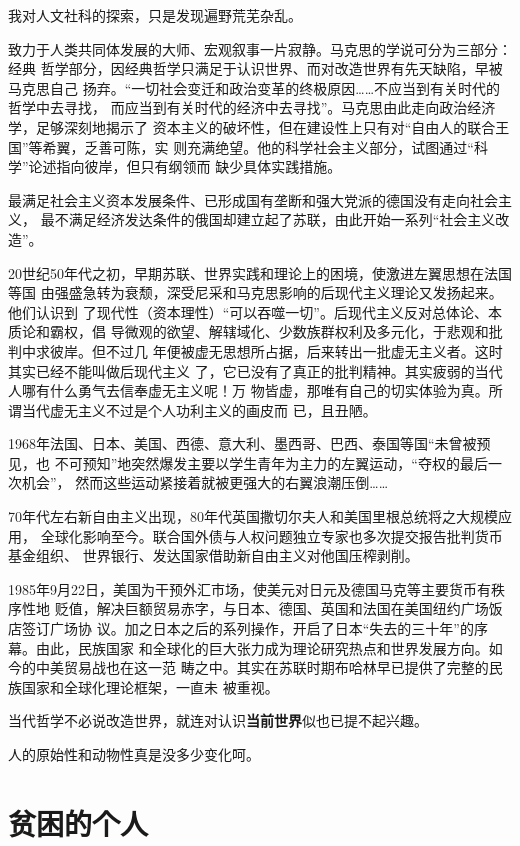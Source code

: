 我对人文社科的探索，只是发现遍野荒芜杂乱。

致力于人类共同体发展的大师、宏观叙事一片寂静。马克思的学说可分为三部分：经典
哲学部分，因经典哲学只满足于认识世界、而对改造世界有先天缺陷，早被马克思自己
扬弃。“一切社会变迁和政治变革的终极原因……不应当到有关时代的哲学中去寻找，
而应当到有关时代的经济中去寻找”。马克思由此走向政治经济学，足够深刻地揭示了
资本主义的破坏性，但在建设性上只有对“自由人的联合王国”等希翼，乏善可陈，实
则充满绝望。他的科学社会主义部分，试图通过“科学”论述指向彼岸，但只有纲领而
缺少具体实践措施。

最满足社会主义资本发展条件、已形成国有垄断和强大党派的德国没有走向社会主义，
最不满足经济发达条件的俄国却建立起了苏联，由此开始一系列“社会主义改造”。

20世纪50年代之初，早期苏联、世界实践和理论上的困境，使激进左翼思想在法国等国
由强盛急转为衰颓，深受尼采和马克思影响的后现代主义理论又发扬起来。他们认识到
了现代性（资本理性）“可以吞噬一切”。后现代主义反对总体论、本质论和霸权，倡
导微观的欲望、解辖域化、少数族群权利及多元化，于悲观和批判中求彼岸。但不过几
年便被虚无思想所占据，后来转出一批虚无主义者。这时其实已经不能叫做后现代主义
了，它已没有了真正的批判精神。其实疲弱的当代人哪有什么勇气去信奉虚无主义呢！万
物皆虚，那唯有自己的切实体验为真。所谓当代虚无主义不过是个人功利主义的画皮而
已，且丑陋。

1968年法国、日本、美国、西德、意大利、墨西哥、巴西、泰国等国“未曾被预见，也
不可预知”地突然爆发主要以学生青年为主力的左翼运动，“夺权的最后一次机会”，
然而这些运动紧接着就被更强大的右翼浪潮压倒……

70年代左右新自由主义出现，80年代英国撒切尔夫人和美国里根总统将之大规模应用，
全球化影响至今。联合国外债与人权问题独立专家也多次提交报告批判货币基金组织、
世界银行、发达国家借助新自由主义对他国压榨剥削。

1985年9月22日，美国为干预外汇市场，使美元对日元及德国马克等主要货币有秩序性地
贬值，解决巨额贸易赤字，与日本、德国、英国和法国在美国纽约广场饭店签订广场协
议。加之日本之后的系列操作，开启了日本“失去的三十年”的序幕。由此，民族国家
和全球化的巨大张力成为理论研究热点和世界发展方向。如今的中美贸易战也在这一范
畴之中。其实在苏联时期布哈林早已提供了完整的民族国家和全球化理论框架，一直未
被重视。

当代哲学不必说改造世界，就连对认识\textbf{当前世界}似也已提不起兴趣。

人的原始性和动物性真是没多少变化呵。

\section*{贫困的个人}

